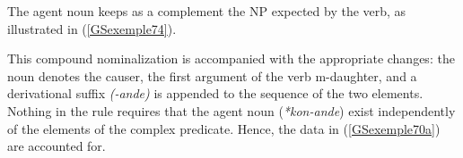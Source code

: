 \documentclass[output=paper
	        ,collection
	        ,collectionchapter
 	        ,biblatex
                ,babelshorthands
                ,newtxmath
                ,draftmode
                ,colorlinks, citecolor=brown
]{langscibook}
\begin{document}
{\begin{exe}
\end{exe}

The agent noun keeps as a complement the NP expected by the verb, as illustrated in (\ref{GSexemple74}).   

\begin{exe}
	\label{GSexemple74}

\end{exe}

This compound nominalization is accompanied with the appropriate changes: the noun denotes the causer, the first argument of the verb m-daughter, and a derivational suffix \emph{(-ande)} is appended to the sequence of the two elements. Nothing in the rule requires that the agent noun (\emph{*kon-ande}) exist independently of the elements of the complex predicate. Hence, the data in (\ref{GSexemple70a}) are accounted for.

}
\end{document}
